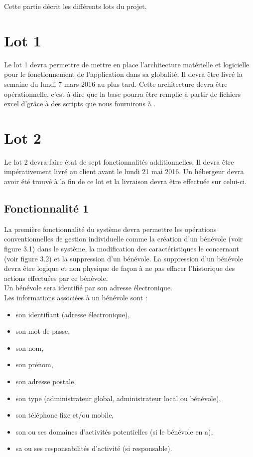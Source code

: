 
Cette partie décrit les différents lots du projet.

\section{Lot 1}
	Le lot 1 devra permettre de mettre en place l'architecture matérielle et logicielle pour le fonctionnement de l'application dans sa globalité. Il devra être livré la semaine du lundi 7 mars 2016 au plus tard. Cette architecture devra être opérationnelle, c'est-à-dire que la base pourra être remplie à partir de fichiers excel d'\nomClient grâce à des scripts que nous fournirons à \nomClient{}.
	
\section{Lot 2}
	Le lot 2 devra faire état de sept fonctionnalités additionnelles. Il devra être impérativement livré au client avant le lundi 21 mai 2016. Un hébergeur devra avoir été trouvé à la fin de ce lot et la livraison devra être effectuée sur celui-ci.



\subsection{Fonctionnalité 1}
La première fonctionnalité du système devra permettre les opérations conventionnelles de gestion individuelle comme la création d'un bénévole (voir figure 3.1) dans le système, la modification des caractéristiques le concernant (voir figure 3.2) et la suppression d'un bénévole. La suppression d'un bénévole devra être logique et non physique de façon à ne pas effacer l'historique des actions effectuées par ce bénévole. \\
Un bénévole sera identifié par son adresse électronique.\\ 
Les informations associées à un bénévole sont :
\begin{itemize}
\item son identifiant (adresse électronique),
\item son mot de passe,
\item son nom,
\item son prénom,
\item son adresse postale,
\item son type (administrateur global, administrateur local ou bénévole),
\item son téléphone fixe et/ou mobile,
\item son ou ses domaines d'activités potentielles (si le bénévole en a),
\item sa ou ses responsabilités d'activité (si responsable).
\\
\end{itemize}

